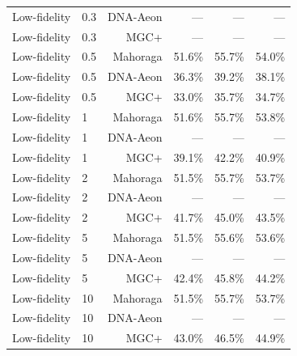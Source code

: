 \begin{table}[H]
\begin{tabular}{llrrrr}
Low-fidelity & 0.3 & DNA-Aeon & --- & --- & --- \\
Low-fidelity & 0.3 & MGC+ & --- & --- & --- \\
Low-fidelity & 0.5 & Mahoraga & 51.6\% & 55.7\% & 54.0\% \\
Low-fidelity & 0.5 & DNA-Aeon & 36.3\% & 39.2\% & 38.1\% \\
Low-fidelity & 0.5 & MGC+ & 33.0\% & 35.7\% & 34.7\% \\
Low-fidelity & 1 & Mahoraga & 51.6\% & 55.7\% & 53.8\% \\
Low-fidelity & 1 & DNA-Aeon & --- & --- & --- \\
Low-fidelity & 1 & MGC+ & 39.1\% & 42.2\% & 40.9\% \\
Low-fidelity & 2 & Mahoraga & 51.5\% & 55.7\% & 53.7\% \\
Low-fidelity & 2 & DNA-Aeon & --- & --- & --- \\
Low-fidelity & 2 & MGC+ & 41.7\% & 45.0\% & 43.5\% \\
Low-fidelity & 5 & Mahoraga & 51.5\% & 55.6\% & 53.6\% \\
Low-fidelity & 5 & DNA-Aeon & --- & --- & --- \\
Low-fidelity & 5 & MGC+ & 42.4\% & 45.8\% & 44.2\% \\
Low-fidelity & 10 & Mahoraga & 51.5\% & 55.7\% & 53.7\% \\
Low-fidelity & 10 & DNA-Aeon & --- & --- & --- \\
Low-fidelity & 10 & MGC+ & 43.0\% & 46.5\% & 44.9\% \\
\bottomrule
\end{tabular}
\end{table}
